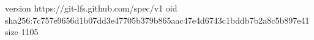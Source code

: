 version https://git-lfs.github.com/spec/v1
oid sha256:7c757e9656d1b07dd3e47705b379b865aac47e4d6743c1bddb7b2a8c5b897e41
size 1105
